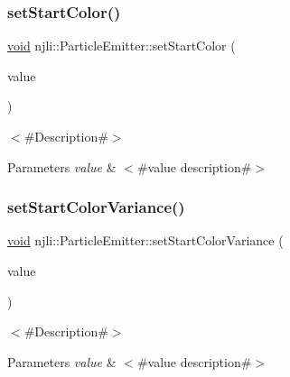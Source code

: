 \subsubsection{\texorpdfstring{set\+Start\+Color()}{setStartColor()}}
{\footnotesize\ttfamily \mbox{\hyperlink{_thread_8h_af1e856da2e658414cb2456cb6f7ebc66}{void}} njli\+::\+Particle\+Emitter\+::set\+Start\+Color (\begin{DoxyParamCaption}\item[{const bt\+Vector4 \&}]{value }\end{DoxyParamCaption})}

$<$\#\+Description\#$>$


\begin{DoxyParams}{Parameters}
{\em value} & $<$\#value description\#$>$ \\
\hline
\end{DoxyParams}
\mbox{\label{classnjli_1_1_particle_emitter_aa99b66eb5a2744af773ef016f86e8ad9}} 
\subsubsection{\texorpdfstring{set\+Start\+Color\+Variance()}{setStartColorVariance()}}
{\footnotesize\ttfamily \mbox{\hyperlink{_thread_8h_af1e856da2e658414cb2456cb6f7ebc66}{void}} njli\+::\+Particle\+Emitter\+::set\+Start\+Color\+Variance (\begin{DoxyParamCaption}\item[{const bt\+Vector4 \&}]{value }\end{DoxyParamCaption})}

$<$\#\+Description\#$>$


\begin{DoxyParams}{Parameters}
{\em value} & $<$\#value description\#$>$ \\
\hline
\end{DoxyParams}
\mbox{\label{classnjli_1_1_particle_emitter_a4ff68f5c5491dc8409ae91d452f423fe}} 
